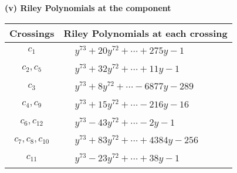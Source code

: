 \documentclass[1p]{elsarticle_modified}
\theoremstyle{definition}
\begin{document}
\newpage\renewcommand{\arraystretch}{1}
\flushleft \textbf{(v) Riley Polynomials at the component}\newline \\
\begin{tabular}{m{50pt}|m{274pt}}
Crossings & \hspace{64pt}Riley Polynomials at each crossing \\
\hline $$\begin{aligned}c_{1}\end{aligned}$$&$\begin{aligned}
&y^{73}+20 y^{72}+\cdots+275 y-1
\end{aligned}$\\
\hline $$\begin{aligned}c_{2},c_{5}\end{aligned}$$&$\begin{aligned}
&y^{73}+32 y^{72}+\cdots+11 y-1
\end{aligned}$\\
\hline $$\begin{aligned}c_{3}\end{aligned}$$&$\begin{aligned}
&y^{73}+8 y^{72}+\cdots-6877 y-289
\end{aligned}$\\
\hline $$\begin{aligned}c_{4},c_{9}\end{aligned}$$&$\begin{aligned}
&y^{73}+15 y^{72}+\cdots-216 y-16
\end{aligned}$\\
\hline $$\begin{aligned}c_{6},c_{12}\end{aligned}$$&$\begin{aligned}
&y^{73}-43 y^{72}+\cdots-2 y-1
\end{aligned}$\\
\hline $$\begin{aligned}c_{7},c_{8},c_{10}\end{aligned}$$&$\begin{aligned}
&y^{73}+83 y^{72}+\cdots+4384 y-256
\end{aligned}$\\
\hline $$\begin{aligned}c_{11}\end{aligned}$$&$\begin{aligned}
&y^{73}-23 y^{72}+\cdots+38 y-1
\end{aligned}$\\
\hline
\end{tabular}\\~\\
\end{document}
